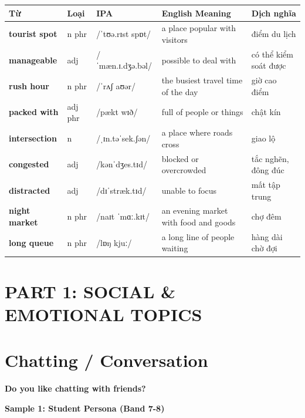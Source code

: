 \vspace{0.8em}
\begin{center}
\renewcommand{\arraystretch}{1.65}
\begin{tabularx}{\textwidth}{|V{0.22\textwidth}|C{0.07\textwidth}|I{0.20\textwidth}|Y|V{0.18\textwidth}|}
\hline
{}
\textbf{Từ} & \textbf{Loại} & \textbf{IPA} & \textbf{English Meaning} & \textbf{Dịch nghĩa} \\
\hline
\textbf{tourist spot} & n phr & /ˈtʊə.rɪst spɒt/ & a place popular with visitors & điểm du lịch \\ \hline
\textbf{manageable} & adj & /ˈmæn.ɪ.dʒə.bəl/ & possible to deal with & có thể kiểm soát được \\ \hline
\textbf{rush hour} & n phr & /ˈrʌʃ aʊər/ & the busiest travel time of the day & giờ cao điểm \\ \hline
\textbf{packed with} & adj phr & /pækt wɪð/ & full of people or things & chật kín \\ \hline
\textbf{intersection} & n & /ˌɪn.təˈsek.ʃən/ & a place where roads cross & giao lộ \\ \hline
\textbf{congested} & adj & /kənˈdʒes.tɪd/ & blocked or overcrowded & tắc nghẽn, đông đúc \\ \hline
\textbf{distracted} & adj & /dɪˈstræk.tɪd/ & unable to focus & mất tập trung \\ \hline
\textbf{night market} & n phr & /naɪt ˈmɑː.kɪt/ & an evening market with food and goods & chợ đêm \\ \hline
\textbf{long queue} & n phr & /lɒŋ kjuː/ & a long line of people waiting & hàng dài chờ đợi \\ \hline
\end{tabularx}
\end{center}

\newpage

\section*{PART 1: SOCIAL \& EMOTIONAL TOPICS}

\section{Chatting / Conversation}
\begin{ieltsquestion}
\textbf{Do you like chatting with friends?}
\end{ieltsquestion}
\textbf{Sample 1: Student Persona (Band 7-8)}

